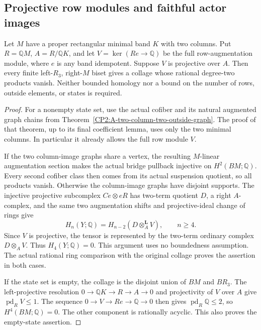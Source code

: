 \subsection{Projective row modules and faithful actor images}

\begin{theorem}
\label{CP2:A-projective-row-two-column-all-states}
Let $M$ have a proper rectangular minimal band $K$ with two columns.
Put $R=\mathbb QM$, $A=R/\mathbb QK$, and let
$V=\ker(Re\to\mathbb Q)$ be the full row-augmentation module,
where $e$ is any band idempotent.  Suppose $V$ is projective over $A$.
Then every finite left-$R_3$, right-$M$ biset gives a collage whose
rational degree-two products vanish.  Neither bounded homology nor
a bound on the number of rows, outside elements, or states is required.
\end{theorem}
\begin{proof}
For a nonempty state set, use the actual cofiber and its natural
augmented graph chains from
Theorem~\ref{CP2:A-two-column-two-outside-graph}.
The proof of that theorem, up to its final coefficient lemma,
uses only the two minimal columns.  In particular it already
allows the full row module $V$.

If the two column-image graphs share a vertex, the resulting
$M$-linear augmentation section makes the actual bridge pullback
injective on $H^2(BM;\mathbb Q)$.  Every second cofiber class then
comes from its actual suspension quotient, so all products vanish.
Otherwise the column-image graphs have disjoint supports.  The
injective projective subcomplex $Ce\otimes eR$ has two-term quotient
$D$, a right $A$-complex, and the same two augmentation shifts and
projective-ideal change of rings give
\[
 H_n(Y;\mathbb Q)=H_{n-2}(D\otimes_A^{\mathbf L}V),\qquad n\ge4.
\]
Since $V$ is projective, the tensor is represented by the two-term
ordinary complex $D\otimes_A V$.  Thus $H_4(Y;\mathbb Q)=0$.
This argument uses no boundedness assumption.
The actual rational ring comparison with the original collage
proves the assertion in both cases.

If the state set is empty, the collage is the disjoint union of
$BM$ and $BR_3$.  The left-projective resolution
$0\to\mathbb QK\to R\to A\to0$ and projectivity of $V$ over $A$
give $\operatorname{pd}_R V\le1$.  The sequence
$0\to V\to Re\to\mathbb Q\to0$ then gives
$\operatorname{pd}_R\mathbb Q\le2$, so $H^4(BM;\mathbb Q)=0$.
The other component is rationally acyclic.  This also proves
the empty-state assertion.
\end{proof}

